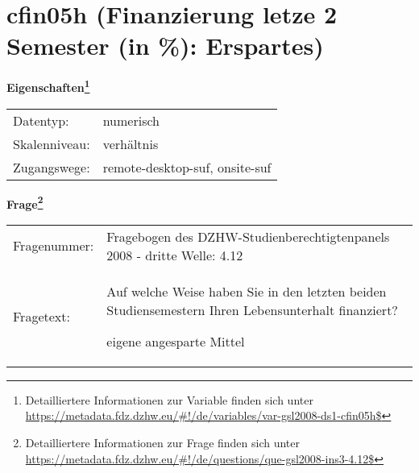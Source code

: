 
    \setcounter{footnote}{0}

    \vspace*{-1.8cm}
	\section{cfin05h (Finanzierung letze 2 Semester (in \%): Erspartes)}
	\label{section:cfin05h}



    \vspace*{0.5cm}
    \noindent\textbf{Eigenschaften\footnote{Detailliertere Informationen zur Variable finden sich unter
		\url{https://metadata.fdz.dzhw.eu/\#!/de/variables/var-gsl2008-ds1-cfin05h$}}}\\
	\begin{tabularx}{\hsize}{@{}lX}
	Datentyp: & numerisch \\
	Skalenniveau: & verhältnis \\
	Zugangswege: &
	  remote-desktop-suf, 
	  onsite-suf
 \\
    \end{tabularx}



				\vspace*{0.5cm}
                \noindent\textbf{Frage\footnote{Detailliertere Informationen zur Frage finden sich unter
		              \url{https://metadata.fdz.dzhw.eu/\#!/de/questions/que-gsl2008-ins3-4.12$}}}\\
				\begin{tabularx}{\hsize}{@{}lX}
					Fragenummer: &
					  Fragebogen des DZHW-Studienberechtigtenpanels 2008 - dritte Welle:
					  4.12
 \\
					Fragetext: & Auf welche Weise haben Sie in den letzten beiden Studiensemestern Ihren Lebensunterhalt finanziert?\par  eigene angesparte Mittel \\
				\end{tabularx}





